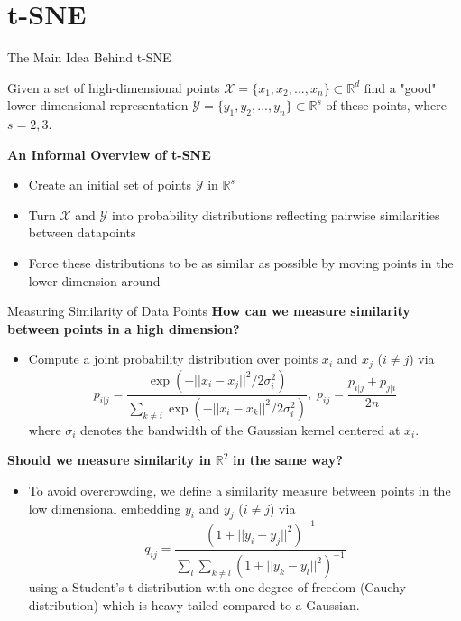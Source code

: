 \section{t-SNE}

\begin{frame}{The Main Idea Behind t-SNE}
    \begin{problem}
        Given a set of high-dimensional points $\mathcal{X} = \{x_1, x_2, ..., x_n\} \subset \mathbb{R}^d$ find a "good" lower-dimensional representation $\mathcal{Y} = \{y_1, y_2, ... , y_n\} \subset \mathbb{R}^s$ of these points, where $s=2,3$. 
    \end{problem}\pause
    \vspace{5pt}
    \textbf{An Informal Overview of t-SNE \cite[Van der Maaten, Hinton]{JMLR:v9:vandermaaten08a}}
    \begin{itemize}
        \item Create an initial set of points $\mathcal{Y}$ in $\mathbb{R}^s$ 
        \item Turn $\mathcal{X}$ and $\mathcal{Y}$ into probability distributions reflecting pairwise similarities between datapoints 
        \item Force these distributions to be as similar as possible by moving points in the lower dimension around 
    \end{itemize}
\end{frame}

\begin{frame}{Measuring Similarity of Data Points}
    \textbf{How can we measure similarity between points in a high dimension?} \pause 
    \begin{itemize}
        \item Compute a joint probability distribution over points $x_i$ and $x_j$ ($i \neq j$) via \[ 
        p_{i|j} = \frac{\exp(-||x_i-x_j||^2/2\sigma_i^2)}{\sum_{k\neq i} \exp (- ||x_i - x_k||^2/2\sigma_i^2)},\; p_{ij} = \frac{p_{i|j}+ p_{j|i}}{2n}
        \]
        where $\sigma_i$ denotes the bandwidth of the Gaussian kernel centered at $x_i$. \pause 
    \end{itemize}
    \textbf{Should we measure similarity in} $\mathbb{R}^2$ \textbf{in the same way?}  \pause 
    \begin{itemize}
        \item To avoid overcrowding, we define a similarity measure between points in the low dimensional embedding $y_i$ and $y_j$ ($i \neq j$) via \[ q_{ij} = \frac{(1+ ||y_i - y_j||^2)^{-1}}{\sum_{l} \sum_{k\neq l} (1+ ||y_k - y_l||^2)^{-1}} \]
        using a Student's t-distribution with one degree of freedom (Cauchy distribution) which is heavy-tailed compared to a Gaussian. 
    \end{itemize}
\end{frame}

